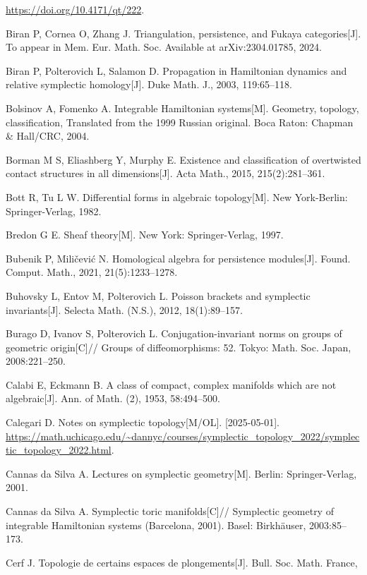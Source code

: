 \begin{enumerate}[label={[\arabic*]},leftmargin=3.2em,itemsep=2pt,parsep=0pt]
        \url{https://doi.org/10.4171/qt/222}.
  \item Biran P, Cornea O, Zhang J. Triangulation, persistence, and Fukaya categories[J].
        To appear in Mem. Eur. Math. Soc. Available at arXiv:2304.01785, 2024.
  \item Biran P, Polterovich L, Salamon D. Propagation in Hamiltonian dynamics and
        relative symplectic homology[J]. Duke Math. J., 2003, 119:65--118.
  \item Bolsinov A, Fomenko A. Integrable Hamiltonian systems[M]. Geometry, topology,
        classification, Translated from the 1999 Russian original. Boca Raton:
        Chapman \& Hall/CRC, 2004.
  \item Borman M S, Eliashberg Y, Murphy E. Existence and classification of overtwisted
        contact structures in all dimensions[J]. Acta Math., 2015, 215(2):281--361.
  \item Bott R, Tu L W. Differential forms in algebraic topology[M]. New York-Berlin:
        Springer-Verlag, 1982.
  \item Bredon G E. Sheaf theory[M]. New York: Springer-Verlag, 1997.
  \item Bubenik P, Miličević N. Homological algebra for persistence modules[J].
        Found. Comput. Math., 2021, 21(5):1233--1278.
  \item Buhovsky L, Entov M, Polterovich L. Poisson brackets and symplectic invariants[J].
        Selecta Math. (N.S.), 2012, 18(1):89--157.
  \item Burago D, Ivanov S, Polterovich L. Conjugation-invariant norms on groups of
        geometric origin[C]// Groups of diffeomorphisms: 52. Tokyo: Math. Soc. Japan,
        2008:221--250.
  \item Calabi E, Eckmann B. A class of compact, complex manifolds which are not
        algebraic[J]. Ann. of Math. (2), 1953, 58:494--500.
  \item Calegari D. Notes on symplectic topology[M/OL]. [2025-05-01].
        \url{https://math.uchicago.edu/~dannyc/courses/symplectic_topology_2022/symplectic_topology_2022.html}.
  \item Cannas da Silva A. Lectures on symplectic geometry[M]. Berlin: Springer-Verlag, 2001.
  \item Cannas da Silva A. Symplectic toric manifolds[C]// Symplectic geometry of integrable
        Hamiltonian systems (Barcelona, 2001). Basel: Birkhäuser, 2003:85--173.
  \item Cerf J. Topologie de certains espaces de plongements[J]. Bull. Soc. Math. France,

\end{enumerate}
